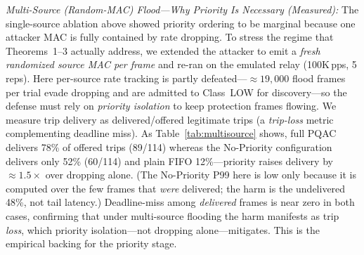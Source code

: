 \documentclass[journal]{IEEEtran}
\begin{document}
\textit{Multi-Source (Random-MAC) Flood---Why Priority Is Necessary (Measured):} The single-source ablation above showed priority ordering to be marginal because one attacker MAC is fully contained by rate dropping. To stress the regime that Theorems~1--3 actually address, we extended the attacker to emit a \emph{fresh randomized source MAC per frame} and re-ran on the emulated relay (100K\,pps, 5 reps). Here per-source rate tracking is partly defeated---$\approx 19{,}000$ flood frames per trial evade dropping and are admitted to Class~LOW for discovery---so the defense must rely on \emph{priority isolation} to keep protection frames flowing. We measure trip delivery as delivered/offered legitimate trips (a \emph{trip-loss} metric complementing deadline miss). As Table~\ref{tab:multisource} shows, full PQAC delivers 78\% of offered trips (89/114) whereas the No-Priority configuration delivers only 52\% (60/114) and plain FIFO 12\%---priority raises delivery by $\approx 1.5\times$ over dropping alone. (The No-Priority P99 here is low only because it is computed over the few frames that \emph{were} delivered; the harm is the undelivered 48\%, not tail latency.) Deadline-miss among \emph{delivered} frames is near zero in both cases, confirming that under multi-source flooding the harm manifests as trip \emph{loss}, which priority isolation---not dropping alone---mitigates. This is the empirical backing for the priority stage.

\begin{table}[t]
\centering
\caption{Multi-Source Random-MAC Flood on Emulated Relay ($\overline{S}=573\,\mu$s, 100K\,pps, 5 reps): Priority Preserves Trip Delivery}
\label{tab:multisource}
\scriptsize
{}
\end{table}
\end{document}
